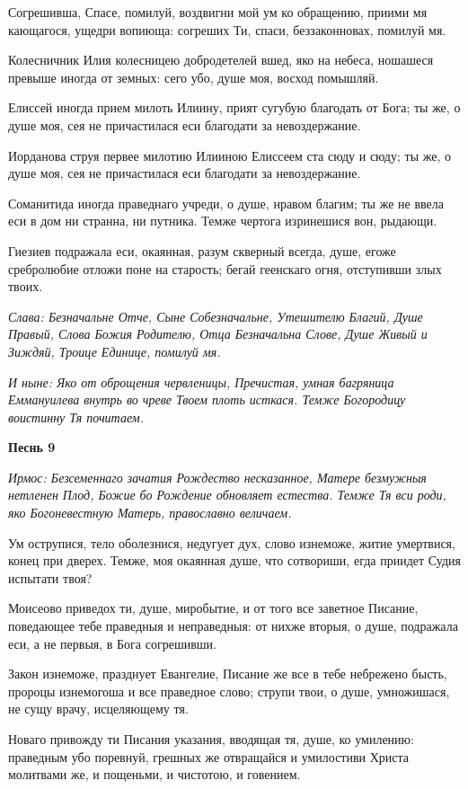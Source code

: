 Согрешивша, Спасе, помилуй, воздвигни мой ум ко обращению, приими мя кающагося, ущедри вопиюща: согреших Ти, спаси, беззаконновах, помилуй мя. 

Колесничник Илия колесницею добродетелей вшед, яко на небеса, ношашеся превыше иногда от земных: сего убо, душе моя, восход помышляй. 

Елиссей иногда прием милоть Илиину, прият сугубую благодать от Бога; ты же, о душе моя, сея не причастилася еси благодати за невоздержание. 

Иорданова струя первее милотию Илииною Елиссеем ста сюду и сюду; ты же, о душе моя, сея не причастилася еси благодати за невоздержание. 

Соманитида иногда праведнаго учреди, о душе, нравом благим; ты же не ввела еси в дом ни странна, ни путника. Темже чертога изринешися вон, рыдающи. 

Гиезиев подражала еси, окаянная, разум скверный всегда, душе, егоже сребролюбие отложи поне на старость; бегай геенскаго огня, отступивши злых твоих. 

\itshape Слава\normalfont{}: Безначальне Отче, Сыне Собезначальне, Утешителю Благий, Душе Правый, Слова Божия Родителю, Отца Безначальна Слове, Душе Живый и Зиждяй, Троице Единице, помилуй мя. 

\itshape И ныне\normalfont{}: Яко от оброщения червленицы, Пречистая, умная багряница Еммануилева внутрь во чреве Твоем плоть исткася. Темже Богородицу воистинну Тя почитаем. 

\medskip\bfseries Песнь 9\normalfont{}

\itshape Ирмос\normalfont{}: Безсеменнаго зачатия Рождество несказанное, Матере безмужныя нетленен Плод, Божие бо Рождение обновляет естества. Темже Тя вси роди, яко Богоневестную Матерь, православно величаем. 

Ум острупися, тело оболезнися, недугует дух, слово изнеможе, житие умертвися, конец при дверех. Темже, моя окаянная душе, что сотвориши, егда приидет Судия испытати твоя? 

Моисеово приведох ти, душе, миробытие, и от того все заветное Писание, поведающее тебе праведныя и неправедныя: от нихже вторыя, о душе, подражала еси, а не первыя, в Бога согрешивши. 

Закон изнеможе, празднует Евангелие, Писание же все в тебе небрежено бысть, пророцы изнемогоша и все праведное слово; струпи твои, о душе, умножишася, не сущу врачу, исцеляющему тя. 

Новаго привожду ти Писания указания, вводящая тя, душе, ко умилению: праведным убо поревнуй, грешных же отвращайся и умилостиви Христа молитвами же, и пощеньми, и чистотою, и говением. 

